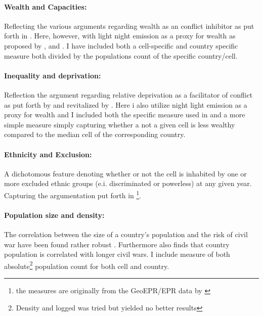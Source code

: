 \documentclass[a4paper]{article}
\begin{document}
\paragraph{Wealth and Capacities:} Reflecting the  various arguments regarding wealth as an conflict inhibitor as put forth in \cite{Collier_Hoeffler_1998, Fearon_Laitin_2003, Collier_Hoeffler_2004}. Here, however, with light night emission as a proxy for wealth as proposed by \cite{Elvidge_2009}, \cite{Chen_Nordhuas_2011} and \cite{Cederman_Gleditsch_Buhaug_2013}. I have included both a cell-specific and country specific measure both divided by the populations count of the specific country/cell.\par

\paragraph{Inequality and deprivation:} Reflection the argument regarding relative deprivation as a facilitator of conflict as put forth by \cite{Gurr_1970} and revitalized by \cite{Cederman_Gleditsch_Buhaug_2013}. Here i also utilize night light emission as a proxy for wealth and I included both the specific measure used in \cite{Cederman_Gleditsch_Buhaug_2013} and a more simple measure simply capturing whether a not a given cell is less wealthy compared to the median cell of the corresponding country.\par

\paragraph{Ethnicity and Exclusion:} A dichotomous feature denoting whether or not the cell is inhabited by one or more excluded ethnic groups (e.i. discriminated or powerless) at any given year. Capturing the argumentation put forth in \cite{Cederman_Weidmann_Gleditsch_2011, Cederman_Gleditsch_Buhaug_2013}\footnote{the measures are originally from the GeoEPR/EPR data by \cite{Vogt_2015}}.\par

\paragraph{Population size and density:} The correlation between the size of a country's population and the risk of civil war have been found rather robust \citep{Collier_Hoeffler_1998, Fearon_Laitin_2003, Collier_Hoeffler_2004, Hegre_Sambanis_2006}. Furthermore \cite[287]{Fearon_2004} also finds that country population is correlated with longer civil wars. I include measure of both absolute\footnote{Density and logged was tried but yielded no better results} population count for both cell and country.\par 
\end{document}
